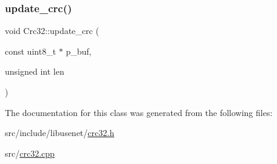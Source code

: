 \hypertarget{class_crc32_abbe8ee7251b1a54e77e8a8c07af4d85d}{}\label{class_crc32_abbe8ee7251b1a54e77e8a8c07af4d85d} 
\subsubsection{\texorpdfstring{update\+\_\+crc()}{update\_crc()}\hspace{0.1cm}{\footnotesize\ttfamily [2/2]}}
{\footnotesize\ttfamily void Crc32\+::update\+\_\+crc (\begin{DoxyParamCaption}\item[{const uint8\+\_\+t $\ast$}]{p\+\_\+buf,  }\item[{unsigned int}]{len }\end{DoxyParamCaption})}



The documentation for this class was generated from the following files\+:\begin{DoxyCompactItemize}
\item 
src/include/libusenet/\hyperlink{crc32_8h}{crc32.\+h}\item 
src/\hyperlink{crc32_8cpp}{crc32.\+cpp}\end{DoxyCompactItemize}

